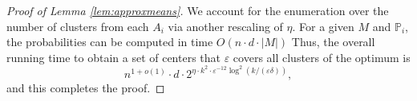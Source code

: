 \documentclass[10pt,a4paper]{amsart}
\begin{document}
\begin{proof}[Proof of Lemma \ref{lem:approxmeans}]
We account for the enumeration over the number of clusters from each $A_i$ via another rescaling of $\eta$.
For a given $M$ and $\mathbb{P}_i$, the probabilities can be computed in time $O(n\cdot d\cdot |M|)$
Thus, the overall running time to obtain a set of centers that $\varepsilon$ covers all clusters of the optimum is
$$n^{1+o(1)} \cdot d \cdot 2^{\eta\cdot k^2 \cdot \varepsilon^{-12} \log^2(k/(\varepsilon\delta))},$$
and this completes the proof.

\end{proof}
\end{document}
